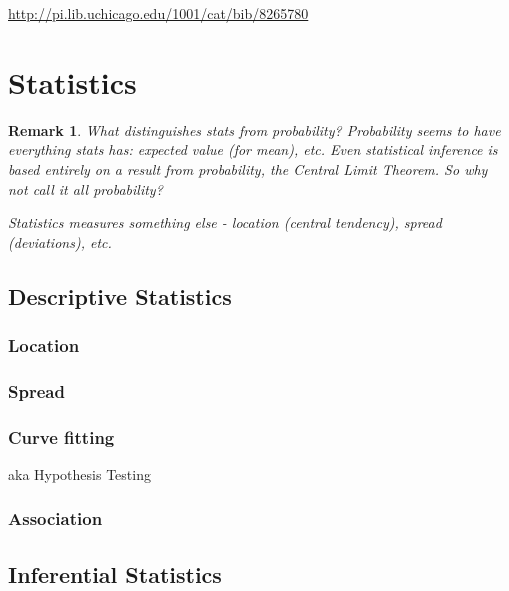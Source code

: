 \documentclass[reqno,12pt]{tufte-book}
\numberwithin{equation}{subsection}
\newtheorem{remark}{Remark}
\begin{document}
\href{Exploratory multivariate analysis by example using R}{http://pi.lib.uchicago.edu/1001/cat/bib/8265780}

\part{Statistics}

\begin{remark}
  What distinguishes stats from probability?  Probability seems to
  have everything stats has: expected value (for mean), etc.  Even
  statistical inference is based entirely on a result from
  probability, the Central Limit Theorem.  So why not call it all
  probability?

Statistics measures something else
  - location (central tendency), spread (deviations), etc.
\end{remark}

\chapter{Descriptive Statistics}

\section{Location}

\section{Spread}

\section{Curve fitting}

aka Hypothesis Testing

\section{Association}

\chapter{Inferential Statistics}
\end{document}
